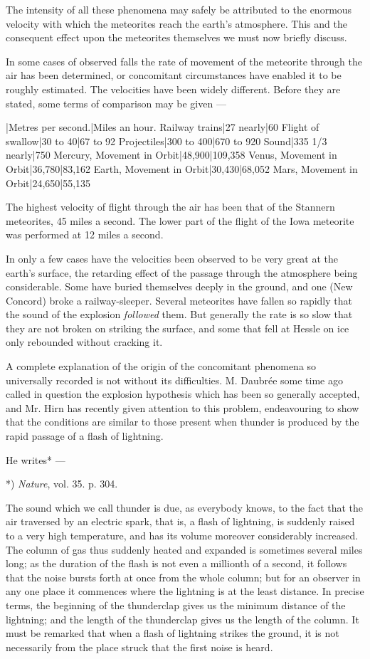 \documentclass[a4paper, 12pt, oneside, polutonikogreek, english]{article}
\begin{document}
The intensity of all these phenomena may safely be attributed to the enormous velocity with which the meteorites reach the earth's atmosphere. This and the consequent effect upon the meteorites themselves we must now briefly discuss.

In some cases of observed falls the rate of movement of the meteorite through the air has been determined, or concomitant circumstances have enabled it to be roughly estimated. The velocities have been widely different. Before they are stated, some terms of comparison may be given ---

|Metres per second.|Miles an hour. 
Railway trains|27 nearly|60 
Flight of swallow|30 to 40|67 to 92 
Projectiles|300 to 400|670 to 920 
Sound|335 1/3 nearly|750 
Mercury, Movement in Orbit|48,900|109,358 
Venus, Movement in Orbit|36,780|83,162 
Earth, Movement in Orbit|30,430|68,052 
Mars, Movement in Orbit|24,650|55,135 

The highest velocity of flight through the air has been that of the Stannern meteorites, 45 miles a second. The lower part of the flight of the Iowa meteorite was performed at 12 miles a second.

In only a few cases have the velocities been observed to be very great at the earth's surface, the retarding effect of the passage through the atmosphere being considerable. Some have buried themselves deeply in the ground, and one (New Concord) broke a railway-sleeper. Several meteorites have fallen so rapidly that the sound of the explosion \emph{followed} them. But generally the rate is so slow that they are not broken on striking the surface, and some that fell at Hessle on ice only rebounded without cracking it.

A complete explanation of the origin of the concomitant phenomena so universally recorded is not without its difficulties. M. Daubrée some time ago called in question the explosion hypothesis which has been so generally accepted, and Mr. Hirn has recently given attention to this problem, endeavouring to show that the conditions are similar to those present when thunder is produced by the rapid passage of a flash of lightning.

He writes* ---

*) \emph{Nature}, vol. 35. p. 304.

The sound which we call thunder is due, as everybody knows, to the fact that the air traversed by an electric spark, that is, a flash of lightning, is suddenly raised to a very high temperature, and has its volume moreover considerably increased. The column of gas thus suddenly heated and expanded is sometimes several miles long; as the duration of the flash is not even a millionth of a second, it follows that the noise bursts forth at once from the whole column; but for an observer in any one place it commences where the lightning is at the least distance. In precise terms, the beginning of the thunderclap gives us the minimum distance of the lightning; and the length of the thunderclap gives us the length of the column. It must be remarked that when a flash of lightning strikes the ground, it is not necessarily from the place struck that the first noise is heard.
\end{document}
